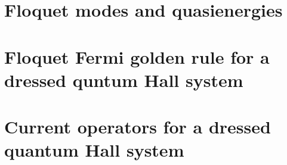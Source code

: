 \documentclass[%
 reprint,
 amsmath,amssymb,
 aps,
prb,
]{revtex4-2}
\begin{document}
\section{\label{appendix_b} Floquet modes and quasienergies}


\section{\label{appendix_c} Floquet Fermi golden rule for a dressed quntum Hall system}


\section{\label{appendix_d} Current operators for a dressed quantum Hall system}


\nocite{*}

\end{document}

